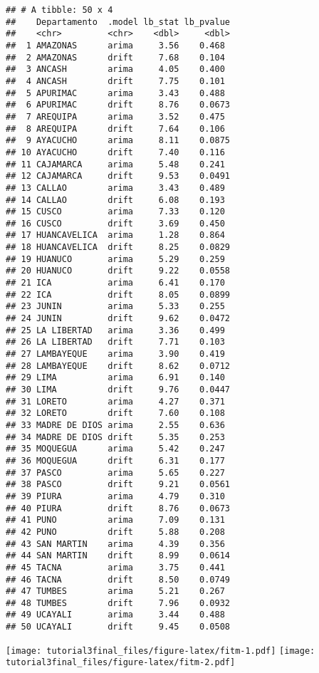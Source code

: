 \documentclass[
]{article}
\begin{document}
\begin{verbatim}
## # A tibble: 50 x 4
##    Departamento  .model lb_stat lb_pvalue
##    <chr>         <chr>    <dbl>     <dbl>
##  1 AMAZONAS      arima     3.56    0.468 
##  2 AMAZONAS      drift     7.68    0.104 
##  3 ANCASH        arima     4.05    0.400 
##  4 ANCASH        drift     7.75    0.101 
##  5 APURIMAC      arima     3.43    0.488 
##  6 APURIMAC      drift     8.76    0.0673
##  7 AREQUIPA      arima     3.52    0.475 
##  8 AREQUIPA      drift     7.64    0.106 
##  9 AYACUCHO      arima     8.11    0.0875
## 10 AYACUCHO      drift     7.40    0.116 
## 11 CAJAMARCA     arima     5.48    0.241 
## 12 CAJAMARCA     drift     9.53    0.0491
## 13 CALLAO        arima     3.43    0.489 
## 14 CALLAO        drift     6.08    0.193 
## 15 CUSCO         arima     7.33    0.120 
## 16 CUSCO         drift     3.69    0.450 
## 17 HUANCAVELICA  arima     1.28    0.864 
## 18 HUANCAVELICA  drift     8.25    0.0829
## 19 HUANUCO       arima     5.29    0.259 
## 20 HUANUCO       drift     9.22    0.0558
## 21 ICA           arima     6.41    0.170 
## 22 ICA           drift     8.05    0.0899
## 23 JUNIN         arima     5.33    0.255 
## 24 JUNIN         drift     9.62    0.0472
## 25 LA LIBERTAD   arima     3.36    0.499 
## 26 LA LIBERTAD   drift     7.71    0.103 
## 27 LAMBAYEQUE    arima     3.90    0.419 
## 28 LAMBAYEQUE    drift     8.62    0.0712
## 29 LIMA          arima     6.91    0.140 
## 30 LIMA          drift     9.76    0.0447
## 31 LORETO        arima     4.27    0.371 
## 32 LORETO        drift     7.60    0.108 
## 33 MADRE DE DIOS arima     2.55    0.636 
## 34 MADRE DE DIOS drift     5.35    0.253 
## 35 MOQUEGUA      arima     5.42    0.247 
## 36 MOQUEGUA      drift     6.31    0.177 
## 37 PASCO         arima     5.65    0.227 
## 38 PASCO         drift     9.21    0.0561
## 39 PIURA         arima     4.79    0.310 
## 40 PIURA         drift     8.76    0.0673
## 41 PUNO          arima     7.09    0.131 
## 42 PUNO          drift     5.88    0.208 
## 43 SAN MARTIN    arima     4.39    0.356 
## 44 SAN MARTIN    drift     8.99    0.0614
## 45 TACNA         arima     3.75    0.441 
## 46 TACNA         drift     8.50    0.0749
## 47 TUMBES        arima     5.21    0.267 
## 48 TUMBES        drift     7.96    0.0932
## 49 UCAYALI       arima     3.44    0.488 
## 50 UCAYALI       drift     9.45    0.0508
\end{verbatim}

\texttt{[image: tutorial3final\_files/figure-latex/fitm-1.pdf]} \texttt{[image: tutorial3final\_files/figure-latex/fitm-2.pdf]}
\end{document}
